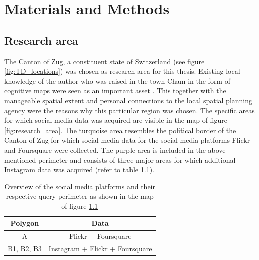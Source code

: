 \chapter{Materials and Methods} \label{material_methods}

\section{Research area} \label{research_area}
The Canton of Zug, a constituent state of Switzerland (see figure \ref{fig:TD_locations}) was chosen as research area for this thesis. Existing local knowledge of the author who was raised in the town Cham in the form of cognitive maps were seen as an important asset \parencite{BenjaminKuipers}. This together with the manageable spatial extent and personal connections to the local spatial planning agency were the reasons why this particular region was chosen. The specific areas for which social media data was acquired are visible in the map of figure \ref{fig:research_area}. The turquoise area resembles the political border of the Canton of Zug for which social media data for the social media platforms Flickr and Foursquare were collected. The purple area is included in the above mentioned perimeter and consists of three major areas for which additional Instagram data was acquired (refer to table \ref{tab:areas_SMD}). 

\begin{table}[h!]
\begin{center}
\caption{Overview of the social media platforms and their respective query perimeter as shown in the map of figure \ref{research_area}}\vspace{1ex}
\label{tab:areas_SMD}
\begin{tabular}{c|c}\hline
Polygon & Data\\ \hline
A & Flickr + Foursquare\\
B1, B2, B3 &  Instagram + Flickr + Foursquare\\
\hline
\end{tabular}
\end{center}
\end{table}

